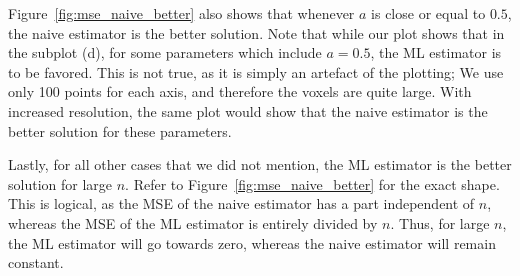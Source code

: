 \documentclass{article}
\newcommand{\piml}{\ensuremath{\pi_{ML}}}
\begin{document}
Figure~\ref{fig:mse_naive_better} also shows that whenever $a$ is close or equal to $0.5$, the naive estimator is the better solution. Note that while our plot shows that in the subplot (d), for some parameters which include $a=0.5$, the ML estimator is to be favored. This is not true, as it is simply an artefact of the plotting; We use only 100 points for each axis, and therefore the voxels are quite large. With increased resolution, the same plot would show that the naive estimator is the better solution for these parameters.

Lastly, for all other cases that we did not mention, the ML estimator is the better solution for large $n$. Refer to Figure~\ref{fig:mse_naive_better} for the exact shape. This is logical, as the MSE of the naive estimator has a part independent of $n$, whereas the MSE of the ML estimator is entirely divided by $n$. Thus, for large $n$, the ML estimator will go towards zero, whereas the naive estimator will remain constant.



\end{document}

